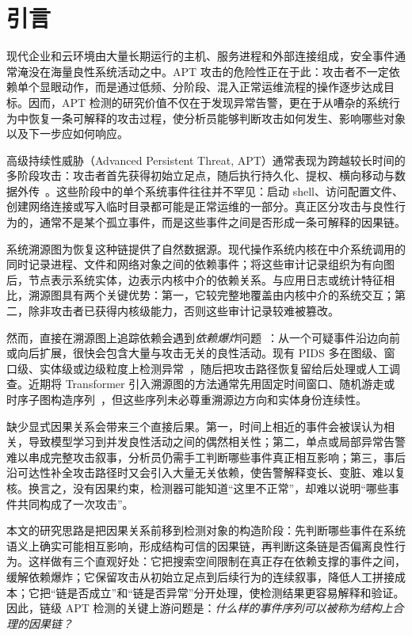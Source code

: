 \section{引言}
\label{sec:introduction}

现代企业和云环境由大量长期运行的主机、服务进程和外部连接组成，安全事件通常淹没在海量良性系统活动之中。APT 攻击的危险性正在于此：攻击者不一定依赖单个显眼动作，而是通过低频、分阶段、混入正常运维流程的操作逐步达成目标。因而，APT 检测的研究价值不仅在于发现异常告警，更在于从嘈杂的系统行为中恢复一条可解释的攻击过程，使分析员能够判断攻击如何发生、影响哪些对象以及下一步应如何响应。

高级持续性威胁（Advanced Persistent Threat, APT）通常表现为跨越较长时间的多阶段攻击：攻击者首先获得初始立足点，随后执行持久化、提权、横向移动与数据外传~\cite{mitreatt}。这些阶段中的单个系统事件往往并不罕见：启动 shell、访问配置文件、创建网络连接或写入临时目录都可能是正常运维的一部分。真正区分攻击与良性行为的，通常不是某个孤立事件，而是这些事件之间是否形成一条可解释的因果链。

系统溯源图为恢复这种链提供了自然数据源。现代操作系统内核在中介系统调用的同时记录进程、文件和网络对象之间的依赖事件；将这些审计记录组织为有向图后，节点表示系统实体，边表示内核中介的依赖关系。与应用日志或统计特征相比，溯源图具有两个关键优势：第一，它较完整地覆盖由内核中介的系统交互；第二，除非攻击者已获得内核级能力，否则这些审计记录较难被篡改。

然而，直接在溯源图上追踪依赖会遇到\emph{依赖爆炸}问题~\cite{kingbacktracking}：从一个可疑事件沿边向前或向后扩展，很快会包含大量与攻击无关的良性活动。现有 PIDS 多在图级、窗口级、实体级或边级粒度上检测异常~\cite{unicorn2020,yang2023prographer,cheng2024kairos,jia2024magic,wang2022threatrace,edgetrace2025}，随后把攻击路径恢复留给后处理或人工调查。近期将 Transformer 引入溯源图的方法通常先用固定时间窗口、随机游走或时序子图构造序列~\cite{eagleeye2024,sentient2026,getaid2025}，但这些序列未必尊重溯源边方向和实体身份连续性。

缺少显式因果关系会带来三个直接后果。第一，时间上相近的事件会被误认为相关，导致模型学习到并发良性活动之间的偶然相关性；第二，单点或局部异常告警难以串成完整攻击叙事，分析员仍需手工判断哪些事件真正相互影响；第三，事后沿可达性补全攻击路径时又会引入大量无关依赖，使告警解释变长、变脏、难以复核。换言之，没有因果约束，检测器可能知道“这里不正常”，却难以说明“哪些事件共同构成了一次攻击”。

本文的研究思路是把因果关系前移到检测对象的构造阶段：先判断哪些事件在系统语义上确实可能相互影响，形成结构可信的因果链，再判断这条链是否偏离良性行为。这样做有三个直观好处：它把搜索空间限制在真正存在依赖支撑的事件之间，缓解依赖爆炸；它保留攻击从初始立足点到后续行为的连续叙事，降低人工拼接成本；它把“链是否成立”和“链是否异常”分开处理，使检测结果更容易解释和验证。因此，链级 APT 检测的关键上游问题是：\emph{什么样的事件序列可以被称为结构上合理的因果链？}

